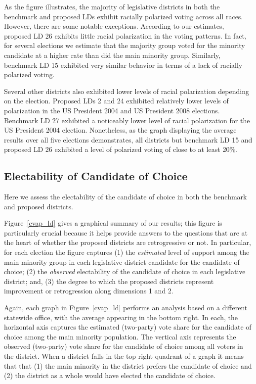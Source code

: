 \documentclass[12pt]{article}
\begin{document}
As the figure illustrates, the majority of legislative districts in both the benchmark and proposed LDs exhibit racially polarized voting across all races. However, there are some notable exceptions. According to our estimates, proposed LD 26 exhibits little racial polarization in the voting patterns. In fact, for several elections we estimate that the majority group voted for the minority candidate at a higher rate than did the main minority group. Similarly, benchmark LD 15 exhibited very similar behavior in terms of a lack of racially polarized voting.

Several other districts also exhibited lower levels of racial polarization depending on the election. Proposed LDs 2 and 24 exhibited relatively lower levels of polarization in the US President 2004 and US President 2008 elections. Benchmark LD 27 exhibited a noticeably lower level of racial polarization for the US President 2004 election. Nonetheless, as the graph displaying the average results over all five elections demonstrates, all districts but benchmark LD 15 and proposed LD 26 exhibited a level of polarized voting of close to at least 20\%.

\subsection{Electability of Candidate of Choice}

Here we assess the electability of the candidate of choice in both the
benchmark and proposed districts.


Figure~\ref{cvap_ld} gives a graphical summary of our results; this
figure is particularly crucial because it helps provide answers to the
questions that are at the heart of whether the proposed districts are
retrogressive or not. In particular, for each election the figure
captures (1) the {\it estimated} level of support among the main
minority group in each legislative district candidate for the
candidate of choice; (2) the {\it observed} electability of the
candidate of choice in each legislative district; and, (3) the
degree to which the proposed districts represent improvement or
retrogression along dimensions 1 and 2.

Again, each graph in Figure~\ref{cvap_ld} performs an analysis based
on a different statewide office, with the average appearing in the
bottom right.  In each, the horizontal axis captures the estimated
(two-party) vote share for the candidate of choice among the main
minority population. The vertical axis represents the observed
(two-party) vote share for the candidate of choice among all voters in
the district.  When a district falls in the top right quadrant of a
graph it means that that (1) the main minority in the district prefers
the candidate of choice and (2) the district as a whole would have
elected the candidate of choice.
\end{document}
